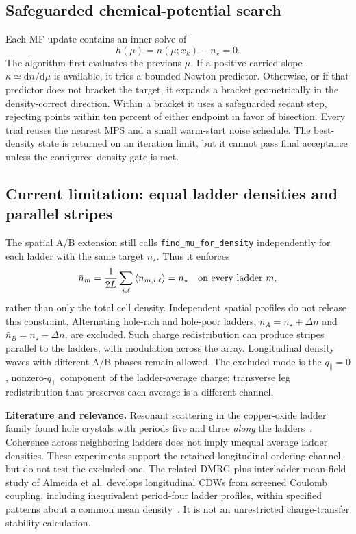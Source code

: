\documentclass[11pt]{article}
\newcommand{\mean}[1]{\left\langle #1\right\rangle}
\newcommand{\dd}{\mathrm d}
\begin{document}
\subsection{Safeguarded chemical-potential search}

Each MF update contains an inner solve of
\begin{equation}
  h(\mu)=n(\mu;x_k)-n_\star=0.
\end{equation}
The algorithm first evaluates the previous \(\mu\).  If a positive carried
slope \(\kappa\simeq\dd n/\dd\mu\) is available, it tries a bounded Newton
predictor.  Otherwise, or if that predictor does not bracket the target, it
expands a bracket geometrically in the density-correct direction.  Within a
bracket it uses a safeguarded secant step, rejecting points within ten percent
of either endpoint in favor of bisection.  Every trial reuses the nearest MPS
and a small warm-start noise schedule.  The best-density state is returned on
an iteration limit, but it cannot pass final acceptance unless the configured
density gate is met.

\subsection{Current limitation: equal ladder densities and parallel stripes}
\label{sec:density-constraint-limit}

The spatial A/B extension still calls \texttt{find\_mu\_for\_density}
independently for each ladder with the same target \(n_\star\).
Thus it enforces
\begin{equation}
 \bar n_m=\frac{1}{2L}\sum_{i,\ell}\mean{n_{m,i,\ell}}=n_\star
 \quad\hbox{on every ladder }m,
\end{equation}
rather than only the total cell density. Independent spatial profiles do
not release this constraint. Alternating hole-rich and hole-poor ladders,
\(\bar n_A=n_\star+\Delta n\) and \(\bar n_B=n_\star-\Delta n\),
are excluded. Such charge redistribution can produce stripes parallel to
the ladders, with modulation across the array. Longitudinal density waves
with different A/B phases remain allowed. The excluded mode is the
\(q_\parallel=0\), nonzero-\(q_\perp\) component of the ladder-average
charge; transverse leg redistribution that preserves each average is a
different channel.

\textbf{Literature and relevance.}
Resonant scattering in the copper-oxide ladder family found hole crystals
with periods five and three \emph{along} the ladders~\cite{abbamonte2004,rusydi2006}.
Coherence across neighboring ladders does not imply unequal average
ladder densities. These experiments support the retained longitudinal
ordering channel, but do not test the excluded one. The related
DMRG plus interladder mean-field study of Almeida et al.\ develops
longitudinal CDWs from screened Coulomb coupling, including inequivalent
period-four ladder profiles, within specified patterns about a common
mean density~\cite{almeida2010}. It is not an unrestricted charge-transfer
stability calculation.
\end{document}
